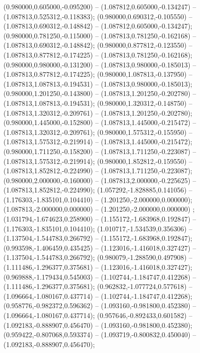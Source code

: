  (0.980000,0.605000,-0.095200) -- (1.087812,0.605000,-0.134247) -- (1.087813,0.525312,-0.118383);
 (0.980000,0.690312,-0.105550) -- (1.087813,0.690312,-0.148842) -- (1.087812,0.605000,-0.134247);
 (0.980000,0.781250,-0.115000) -- (1.087813,0.781250,-0.162168) -- (1.087813,0.690312,-0.148842);
 (0.980000,0.877812,-0.123550) -- (1.087813,0.877812,-0.174225) -- (1.087813,0.781250,-0.162168);
 (0.980000,0.980000,-0.131200) -- (1.087813,0.980000,-0.185013) -- (1.087813,0.877812,-0.174225);
 (0.980000,1.087813,-0.137950) -- (1.087813,1.087813,-0.194531) -- (1.087813,0.980000,-0.185013);
 (0.980000,1.201250,-0.143800) -- (1.087813,1.201250,-0.202780) -- (1.087813,1.087813,-0.194531);
 (0.980000,1.320312,-0.148750) -- (1.087813,1.320312,-0.209761) -- (1.087813,1.201250,-0.202780);
 (0.980000,1.445000,-0.152800) -- (1.087813,1.445000,-0.215472) -- (1.087813,1.320312,-0.209761);
 (0.980000,1.575312,-0.155950) -- (1.087813,1.575312,-0.219914) -- (1.087813,1.445000,-0.215472);
 (0.980000,1.711250,-0.158200) -- (1.087813,1.711250,-0.223087) -- (1.087813,1.575312,-0.219914);
 (0.980000,1.852812,-0.159550) -- (1.087813,1.852812,-0.224990) -- (1.087813,1.711250,-0.223087);
 (0.980000,2.000000,-0.160000) -- (1.087813,2.000000,-0.225625) -- (1.087813,1.852812,-0.224990);
 (1.057292,-1.828885,0.141056) -- (1.176303,-1.835101,0.104410) -- (1.201250,-2.000000,0.000000);
 (1.087813,-2.000000,0.000000) -- (1.201250,-2.000000,0.000000) ;
 (1.031794,-1.674623,0.258900) -- (1.155172,-1.683968,0.192847) -- (1.176303,-1.835101,0.104410);
 (1.010717,-1.534539,0.356306) -- (1.137504,-1.544783,0.266792) -- (1.155172,-1.683968,0.192847);
 (0.993598,-1.406459,0.435425) -- (1.123016,-1.416018,0.327427) -- (1.137504,-1.544783,0.266792);
 (0.980079,-1.288590,0.497908) -- (1.111486,-1.296377,0.375681) -- (1.123016,-1.416018,0.327427);
 (0.969888,-1.179434,0.545003) -- (1.102744,-1.184747,0.412268) -- (1.111486,-1.296377,0.375681);
 (0.962832,-1.077724,0.577618) -- (1.096664,-1.080167,0.437714) -- (1.102744,-1.184747,0.412268);
 (0.958776,-0.982372,0.596362) -- (1.093160,-0.981800,0.452380) -- (1.096664,-1.080167,0.437714);
 (0.957646,-0.892433,0.601582) -- (1.092183,-0.888907,0.456470) -- (1.093160,-0.981800,0.452380);
 (0.959422,-0.807068,0.593374) -- (1.093719,-0.800832,0.450040) -- (1.092183,-0.888907,0.456470);
